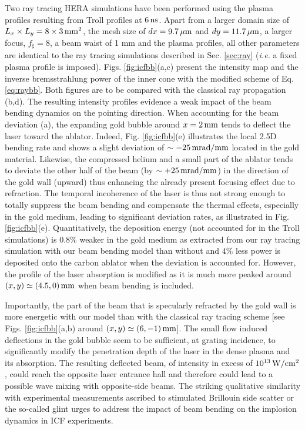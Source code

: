 \documentclass[%
 reprint,
 amsmath,amssymb,
 aps,
]{revtex4-1}
\begin{document}
Two ray tracing HERA simulations have been performed using the plasma profiles resulting from Troll profiles at $6\, \rm ns$. Apart from a larger domain size of $L_x\times L_y = 8 \times 3 \, \rm mm^2$, the mesh size of  $dx = 9.7\, \rm \mu m$ and $dy =11.7\, \rm \mu m$, a larger focus, $f_\sharp=8$, a beam waist of 1 mm and the plasma profiles, all other parameters are identical to the ray tracing simulations described in   Sec. \ref{sec:ray} (\emph{i.e.} a fixed plasma profile is imposed).  Figs.  \ref{fig:icfbb}(a,c) present the intensity map and the inverse bremsstrahlung power of the inner cone with the modified scheme of Eq. \eqref{eq:raybb}. Both figures are to be compared with the  classical ray propagation (b,d). The resulting intensity profiles  evidence a weak impact of the beam bending dynamics on the pointing direction.  When accounting for the beam deviation (a), the expanding gold bubble around  $x=2\,\rm mm$ tends to deflect the laser toward the ablator. Indeed, Fig. \ref{fig:icfbb}(e) illustrates the local 2.5D bending rate and shows a slight deviation of $\sim -25 \, \rm mrad/mm$ located in the gold material. Likewise, the compressed helium and a small part of the ablator tends to deviate the other half of the beam   (by $\sim + 25 \, \rm mrad/mm$)  in the direction of the gold wall (upward) thus enhancing the already present focusing effect due to refraction.
The temporal incoherence of the laser is thus not strong enough to totally suppress the beam bending and compensate the thermal effects, especially in the gold medium, leading to significant deviation rates, as illustrated in Fig. \ref{fig:icfbb}(e). 
Quantitatively, the deposition energy (not accounted for in the Troll simulations) is $0.8\%$ weaker in the gold medium as extracted from our ray tracing simulation  with our beam bending model than without and $4\%$ less power is deposited onto the carbon ablator when the deviation is accounted for.
However, the profile of the laser absorption is  modified as it is much more peaked   around $(x,y)\simeq (4.5,0)\, \rm mm$ when  beam bending is included.

Importantly, the part of the beam that is specularly refracted by the gold wall is more energetic with  our model  than with the classical ray tracing scheme [see Figs. \ref{fig:icfbb}(a,b) around $(x,y)\simeq (6,-1)\, \rm mm$]. The small flow induced deflections in the gold bubble seem to be sufficient, at grating incidence, to significantly modify the penetration depth of the laser in the dense plasma and its absorption. 
The resulting deflected beam, of intensity in excess of $10^{13}\,\rm W/cm^2$, could reach the opposite laser entrance hall 
and therefore  could lead to a possible wave mixing with opposite-side beams. 
The striking qualitative similarity with experimental measurements ascribed to stimulated Brillouin side scatter or the so-called glint \cite[]{Honda_1998,PRL_Turnbull_2015,abstract_Lemos_Glint}  urges to address the impact of beam bending on  the implosion dynamics in ICF experiments.
\end{document}
